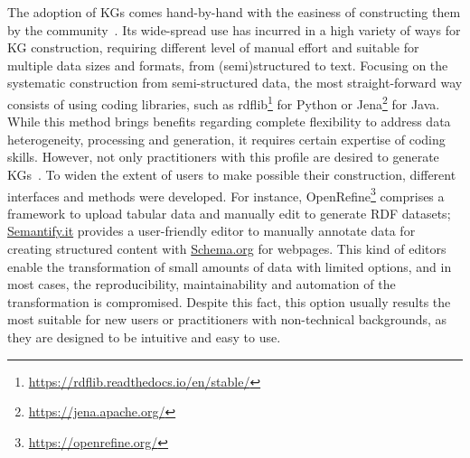 The adoption of KGs comes hand-by-hand with the easiness of constructing them by the community~\citep{hogan2020twodecades,karger2014semantic}. Its wide-spread use has incurred in a high variety of ways for KG construction, requiring different level of manual effort and suitable for multiple data sizes and formats, from (semi)structured to text. Focusing on the systematic construction from semi-structured data, the most straight-forward way consists of using coding libraries, such as rdflib\footnote{\url{https://rdflib.readthedocs.io/en/stable/}} for Python or Jena\footnote{\url{https://jena.apache.org/}} for Java. While this method brings benefits regarding complete flexibility to address data heterogeneity, processing and generation, it requires certain expertise of coding skills. However, not only practitioners with this profile are desired to generate KGs~\citep{karger2014semantic}. To widen the extent of users to make possible their construction, different interfaces and methods were developed. For instance, OpenRefine\footnote{\url{https://openrefine.org/}} comprises a framework to upload tabular data and manually edit to generate RDF datasets; \url{Semantify.it} provides a user-friendly editor to manually annotate data for creating structured content with \url{Schema.org} for webpages. This kind of editors enable the transformation of small amounts of data with limited options, and in most cases, the reproducibility, maintainability and automation of the transformation is compromised. Despite this fact, this option usually results the most suitable for new users or practitioners with non-technical backgrounds, as they are designed to be intuitive and easy to use. 


